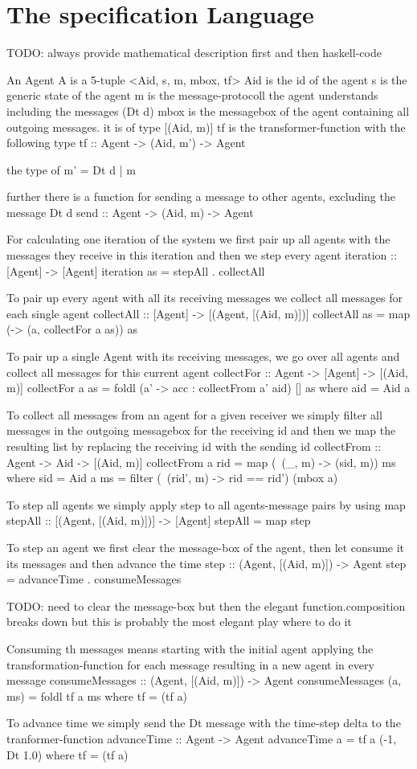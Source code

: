 \section{The specification Language}

TODO: always provide mathematical description first and then haskell-code

An Agent A is a 5-tuple <Aid, s, m, mbox, tf>
Aid is the id of the agent
s is the generic state of the agent
m is the message-protocoll the agent understands including the messages (Dt d)
mbox is the messagebox of the agent containing all outgoing messages. it is of type [(Aid, m)]
tf is the transformer-function with the following type tf :: Agent -> (Aid, m') -> Agent

the type of m' = Dt d | m

further there is a function for sending a message to other agents, excluding the message Dt d
send :: Agent -> (Aid, m) -> Agent

For calculating one iteration of the system we first pair up all agents with the messages they receive in this iteration and then we step every agent
iteration :: [Agent] -> [Agent]
iteration as = stepAll . collectAll

To pair up every agent with all its receiving messages we collect all messages for each single agent
collectAll :: [Agent] -> [(Agent, [(Aid, m)])]
collectAll as = map (\a -> (a, collectFor a as)) as

To pair up a single Agent with its receiving messages, we go over all agents and collect all messages for this current agent
collectFor :: Agent -> [Agent] -> [(Aid, m)]
collectFor a as = foldl (\acc a' -> acc : collectFrom a' aid) [] as
	where
		aid = Aid a

To collect all messages from an agent for a given receiver we simply filter all messages in the outgoing messagebox for the receiving id and then we map the resulting list by replacing the receiving id with the sending id
collectFrom :: Agent -> Aid -> [(Aid, m)]
collectFrom a rid = map (\ (_, m) -> (sid, m)) ms
	where
		sid = Aid a
		ms = filter (\ (rid', m) -> rid == rid') (mbox a)

To step all agents we simply apply step to all agents-message pairs by using map
stepAll :: [(Agent, [(Aid, m)])] -> [Agent]
stepAll = map step

To step an agent we first clear the message-box of the agent, then let consume it its messages and then advance the time 
step :: (Agent, [(Aid, m)]) -> Agent
step = advanceTime . consumeMessages 

TODO: need to clear the message-box but then the elegant function.composition breaks down but this is probably the most elegant play where to do it

Consuming th messages means starting with the initial agent applying the transformation-function for each message resulting in a new agent in every message
consumeMessages :: (Agent, [(Aid, m)]) -> Agent
consumeMessages (a, ms) = foldl tf a ms
	where
		tf = (tf a)

To advance time we simply send the Dt message with the time-step delta to the tranformer-function
advanceTime :: Agent -> Agent
advanceTime a = tf a (-1, Dt 1.0)
	where
		tf = (tf a)